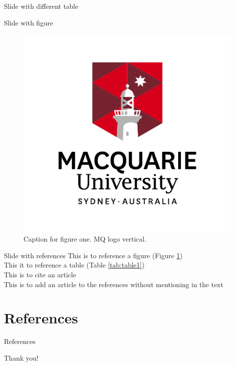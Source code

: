 \documentclass[aspectratio=169, 12pt]{beamer} %
\begin{document}
\begin{frame}{Slide with different table}
  
\end{frame}

\begin{frame}{Slide with figure}
  \begin{figure}[H]
    \centering
        \includegraphics[height=.7\textheight]{branding/MQ_INT_VER_RGB_POS.pdf}
        \caption{Caption for figure one. MQ logo vertical.}
        \label{fig:figure1}
  \end{figure}
\end{frame}

\begin{frame}{Slide with references}
  This is to reference a figure (Figure \ref{fig:figure1})\\
    This it to reference a table (Table \ref{tab:table1})\\
    This is to cite an article \cite{Sobotkova2015-lq, Nosek2018-yv}\\
    This is to add an article to the references without mentioning in the text \nocite{Borgman2015-rh, Center_for_Open_Science2018-pn}\\
\end{frame}
\section{References}

\begin{frame}[allowframebreaks]{References}
  \tiny
  
  
\end{frame}


\begin{frame}[standout]
Thank you!
\end{frame}
\end{document}
